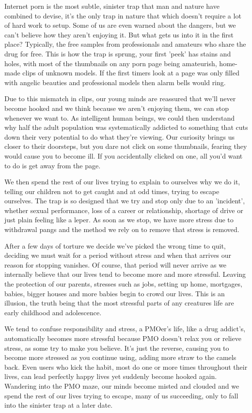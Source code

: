 \documentclass[easypeasy.tex]{subfiles}
\begin{document}
Internet porn is the most subtle, sinister trap that man and nature have combined to devise, it's the only trap in nature that which doesn't require a lot of hard work to setup. Some of us are even warned about the dangers, but we can't believe how they aren't enjoying it. But what gets us into it in the first place? Typically, the free samples from professionals and amateurs who share the drug for free. This is how the trap is sprung, your first 'peek' has stains and holes, with most of the thumbnails on any porn page being amateurish, home-made clips of unknown models. If the first timers look at a page was only filled with angelic beauties and professional models then alarm bells would ring.

Due to this mismatch in clips, our young minds are reassured that we'll never become hooked and we think because we aren't enjoying them, we can stop whenever we want to. As intelligent human beings, we could then understand why half the adult population was systematically addicted to something that cuts down their very potential to do what they're viewing. Our curiosity brings us closer to their doorsteps, but you dare not click on some thumbnails, fearing they would cause you to become ill. If you accidentally clicked on one, all you'd want to do is get away from the page.

We then spend the rest of our lives trying to explain to ourselves why we do it, telling our children not to get caught and at odd times, trying to escape ourselves. The trap is so designed that we try and stop only due to an 'incident', whether sexual performance, loss of a career or relationship, shortage of drive or just plain feeling like a leper. As soon as we stop, we have more stress due to withdrawal pangs and the method we rely on to remove that stress is removed.

After a few days of torture we decide we've picked the wrong time to quit, deciding we must wait for a period without stress and when that arrives our reason for stopping vanishes. Of course, that period will never arrive as we internally believe that our lives tend to become more and more stressful. Leaving the protection of our parents, stresses such as jobs, setting up home, mortgages, babies, bigger houses and more babies begin to crowd our lives. This is an illusion, the truth being that the most stressful parts of any creatures life are early childhood and adolescence.

We tend to confuse responsibility and stress, a PMOer's life, like a drug addict's, automatically becomes more stressful because PMO doesn't relax you or relieve stress, as some try to make you believe. It's just the reverse, causing you to become more stressed as you continue using, adding more straw to the camels back. Even users who kick the habit, most do one or more times throughout their lives, can lead perfectly happy lives yet suddenly become hooked again. Wandering into the PMO maze, our minds become misted and clouded and we spend the rest of our lives trying to escape, many of us succeeding, only to fall into the sinister trap at a later date.
\end{document}

